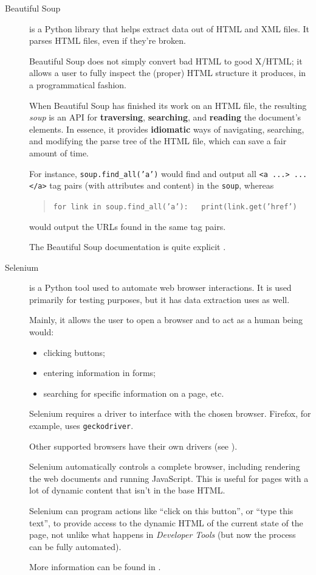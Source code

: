 \begin{description}
\item[Beautiful Soup] is a Python library that helps extract data out of HTML and XML files. It parses HTML files, even if they're broken. \par Beautiful Soup does not simply convert bad HTML to good X/HTML; it allows a user to fully inspect the (proper) HTML structure it produces, in a programmatical fashion. \par 
When Beautiful Soup has finished its work on an HTML file, the resulting \textit{soup} is an API for \textbf{traversing}, \textbf{searching}, and \textbf{reading} the document's elements. In essence, it provides \textbf{idiomatic} ways of navigating, searching, and modifying the parse tree of the HTML file, which can save a fair amount of time.
\par For instance, \texttt{soup.find\_all('a')} would find and output all \texttt{<a ...> ... </a>} tag pairs (with attributes and content) in the \texttt{soup}, whereas \begin{quote}\texttt{for link in soup.find\_all('a'):}\newline \texttt{\ \ \ print(link.get('href')}
\end{quote} would output the URLs found in the same tag pairs. \par The Beautiful Soup documentation is quite explicit \cite{DC_BS}. 
\item[Selenium] is a Python tool used to automate web browser interactions.  It is used primarily for testing purposes, but it has data extraction uses as well. 
\par Mainly, it allows the user to open a browser and to act as a human being would:
\begin{itemize}[noitemsep]
    \item clicking buttons;
\item entering information in forms;
\item searching for specific information on a page, etc.
\end{itemize}
Selenium requires a driver to interface with the chosen browser. Firefox, for example, uses \texttt{geckodriver}.

Other supported browsers have their own drivers (see \cite{DC_S_C,DC_S_E,DC_S_F,DC_S_S}).

Selenium automatically controls a complete browser, including rendering the web documents and running JavaScript. This is useful for pages with a lot of dynamic content that isn't in the base HTML.

Selenium can program actions like ``click on this button'', or ``type this text'', to provide access to the dynamic HTML of the current state of the page, not unlike what happens in  \textit{Developer Tools} (but now the process can be fully automated).

More information can be found in \cite{DC_S,DC_S2}.
\end{description}
